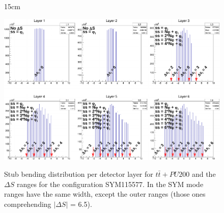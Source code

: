 \begin{figure}[htbp]{15cm}
	\caption{Stub bending distribution per detector layer for $t\bar{t}+PU200$ and the $\Delta S$ ranges for the configuration SYM115577. In the SYM mode ranges have the same width, except the outer ranges (those ones comprehending $|\Delta S|$ = 6.5).}
	\centering
	\includegraphics[scale=0.8,angle=90]{AppendixCMSL1TT/figs/ttbar_pu200_sym115577}
	\label{fig:deltaS_ttbar_sym}
\end{figure}

